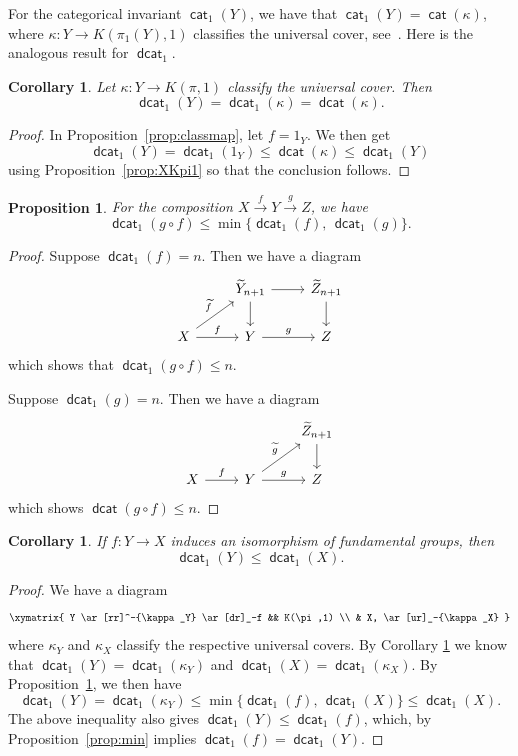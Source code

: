 \documentclass[amscd,amssymb,verbatim,11pt]{amsart}
\theoremstyle{plain}
\newtheorem{proposition}[thm]{Proposition}
\newtheorem{corollary}[thm]{Corollary}
\theoremstyle{definition}
\DeclareMathOperator{\cat}{{\mathsf{cat}}}
\DeclareMathOperator{\dcat}{{\mathsf{dcat}}}
\begin{document}
For the categorical invariant $\cat_1(Y)$, we have that $\cat_1(Y) = \cat(\kappa)$, where $\kappa\colon
Y \to K(\pi_1(Y),1)$ classifies the universal cover, see~\cite[Section 9.3]{CLOT}. Here is the analogous result for $\dcat_1$.

\begin{corollary}\label{cor:classmap}
Let $\kappa\colon Y \to K(\pi,1)$ classify the universal cover. Then
$$\dcat_1(Y) = \dcat_1(\kappa) = \dcat(\kappa).$$
\end{corollary}
\begin{proof}
In Proposition~\ref{prop:classmap}, let $f=1_Y$. We then get
$$\dcat_1(Y) = \dcat_1(1_Y) \leq \dcat(\kappa) \leq \dcat_1(Y)$$
using Proposition~\ref{prop:XKpi1} so that the conclusion follows.
\end{proof}


\begin{proposition}\label{prop:compmin}
For the composition $X \stackrel{f}{\to} Y \stackrel{g}{\to} Z$, we have
$$\dcat_1(g \circ f) \leq \min\{\dcat_1(f),\, \dcat_1(g)\}.$$
\end{proposition}
\begin{proof}
Suppose $\dcat_1(f)=n$. Then we have a diagram
\[
\begin{tikzcd}[contains/.style = {draw=none,"\in" description,sloped}]
&
\widetilde Y_{n+1} \arrow{r}{} \arrow[swap]{d}{}
&
\widetilde Z_{n+1} \arrow{d}{}
\\
X  \arrow{r}{f}  \arrow{ur}{\widetilde f}
&
Y \arrow{r}{g}
&
Z
\end{tikzcd}
\]
which shows that $\dcat_1(g\circ f) \leq n$.

Suppose $\dcat_1(g)=n$. Then we have a diagram
\[
\begin{tikzcd}[contains/.style = {draw=none,"\in" description,sloped}]
&
&
\widetilde Z_{n+1} \arrow{d}{}
\\
X  \arrow{r}{f}
&
Y \arrow{r}{g}  \arrow{ur}{\widetilde g}
&
Z
\end{tikzcd}
\]
which shows $\dcat(g\circ f) \leq n$.
\end{proof}

\begin{corollary}\label{cor:isoineq}
If $f\colon Y \to X$ induces an isomorphism of fundamental groups, then
$$\dcat_1(Y) \leq \dcat_1(X).$$
\end{corollary}
\begin{proof}
We have a diagram
$$\xymatrix{
Y \ar[rr]^-{\kappa_Y} \ar[dr]_-f && K(\pi,1) \\
& X, \ar[ur]_-{\kappa_X}
}
$$
where $\kappa_Y$ and $\kappa_X$ classify the respective universal covers. By Corollary
\ref{cor:classmap} we know that $\dcat_1(Y)=\dcat_1(\kappa_Y)$ and $\dcat_1(X) =
\dcat_1(\kappa_X)$. By Proposition~\ref{prop:compmin}, we then have
$$\dcat_1(Y) =\dcat_1(\kappa_Y) \leq \min\{\dcat_1(f),\, \dcat_1(X)\}\leq \dcat_1(X).$$
The above inequality also gives $\dcat_1(Y)\le\dcat_1(f)$, which, by Proposition~\ref{prop:min} implies $\dcat_1(f)=\dcat_1(Y)$.
\end{proof}
\end{document}
